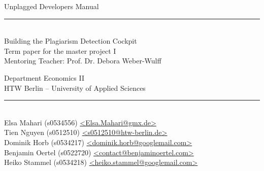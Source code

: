 \begin{titlepage}
\vspace*{2cm}

\begin{center}
\Huge
Unplagged Developers Manual\\
\large
\vspace{0.5cm}
\rule[3mm]{1cm}{0.05mm}\\
Building the Plagiarism Detection Cockpit\\
\normalsize
\vfill
Term paper for the master project I \\ Mentoring Teacher: Prof. Dr. Debora Weber-Wulff\\
\vfill

Department Economics II\\
HTW Berlin -- University of Applied Sciences\\

\rule{8.2cm}{0.2mm}\\
Elsa Mahari (s0534556) \href{mailto:elsa.mahari@gmx.de}{\textless Elsa.Mahari@gmx.de\textgreater}\\
Tien Nguyen (s0512510) \href{mailto:s0512510@htw-berlin.de}{\textless s0512510@htw-berlin.de\textgreater}\\
Dominik Horb (s0534217) \href{mailto:dominik.horb@googlemail.com}{\textless dominik.horb@googlemail.com\textgreater}\\
Benjamin Oertel (s0522720) \href{mailto:contact@benjaminoertel.com}{\textless contact@benjaminoertel.com\textgreater}\\
Heiko Stammel (s0534218) \href{mailto:heiko.stammel@googlemail.com}{\textless heiko.stammel@googlemail.com\textgreater}\\


\end{center}
\end{titlepage}
